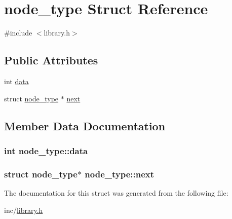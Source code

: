 \hypertarget{structnode__type}{\section{node\-\_\-type Struct Reference}
\label{structnode__type}
}


{\ttfamily \#include $<$library.\-h$>$}

\subsection*{Public Attributes}
\begin{DoxyCompactItemize}
\item 
int \hyperlink{structnode__type_a1545bf0722a2d74eba078c1ce0649022}{data}
\item 
struct \hyperlink{structnode__type}{node\-\_\-type} $\ast$ \hyperlink{structnode__type_a554096be5152b93551dcd6fab00930c7}{next}
\end{DoxyCompactItemize}


\subsection{Member Data Documentation}
\hypertarget{structnode__type_a1545bf0722a2d74eba078c1ce0649022}{
\subsubsection[{data}]{\setlength{\rightskip}{0pt plus 5cm}int node\-\_\-type\-::data}}\label{structnode__type_a1545bf0722a2d74eba078c1ce0649022}
\hypertarget{structnode__type_a554096be5152b93551dcd6fab00930c7}{
\subsubsection[{next}]{\setlength{\rightskip}{0pt plus 5cm}struct {\bf node\-\_\-type}$\ast$ node\-\_\-type\-::next}}\label{structnode__type_a554096be5152b93551dcd6fab00930c7}


The documentation for this struct was generated from the following file\-:\begin{DoxyCompactItemize}
\item 
inc/\hyperlink{library_8h}{library.\-h}\end{DoxyCompactItemize}
